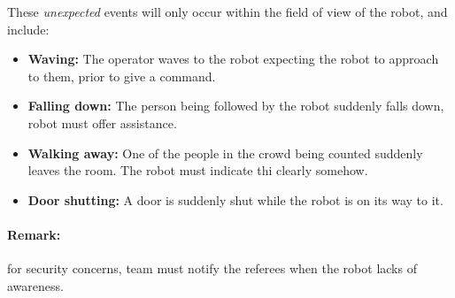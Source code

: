 These \textit{unexpected} events will only occur within the field of view of the robot, and include:
\begin{itemize}
	\item \textbf{Waving:} The operator waves to the robot expecting the robot to approach to them, prior to give a command.
	\item \textbf{Falling down:} The person being followed by the robot suddenly falls down, robot must offer assistance.
	\item \textbf{Walking away:} One of the people in the crowd being counted suddenly leaves the room. The robot must indicate thi clearly somehow. 
	\item \textbf{Door shutting:} A door is suddenly shut while the robot is on its way to it.
\end{itemize}

\paragraph*{Remark:} for security concerns, team must notify the referees when the robot lacks of awareness.

